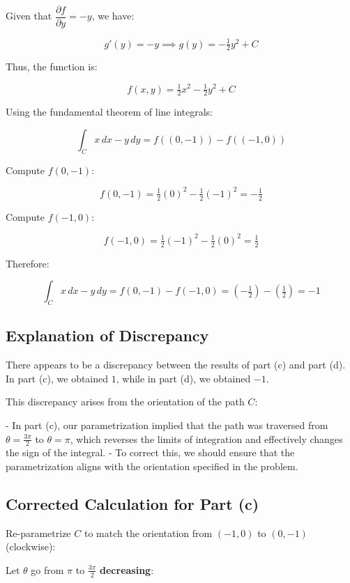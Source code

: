 \documentclass[11pt]{article}
\begin{document}
Given that $\dfrac{\partial f}{\partial y} = -y$, we have:

\[
g'(y) = -y \implies g(y) = -\tfrac{1}{2} y^2 + C
\]

Thus, the function is:

\[
f(x, y) = \tfrac{1}{2} x^2 - \tfrac{1}{2} y^2 + C
\]

Using the fundamental theorem of line integrals:

\[
\int_C x \, dx - y \, dy = f\left( (0, -1) \right) - f\left( (-1, 0) \right)
\]

Compute $f(0, -1)$:

\[
f(0, -1) = \tfrac{1}{2} (0)^2 - \tfrac{1}{2} (-1)^2 = -\tfrac{1}{2}
\]

Compute $f(-1, 0)$:

\[
f(-1, 0) = \tfrac{1}{2} (-1)^2 - \tfrac{1}{2} (0)^2 = \tfrac{1}{2}
\]

Therefore:

\[
\int_C x \, dx - y \, dy = f(0, -1) - f(-1, 0) = \left( -\tfrac{1}{2} \right) - \left( \tfrac{1}{2} \right) = -1
\]

\newpage

\subsection{Explanation of Discrepancy}

There appears to be a discrepancy between the results of part (c) and part (d). In part (c), we obtained $1$, while in part (d), we obtained $-1$.

This discrepancy arises from the orientation of the path $C$:

- In part (c), our parametrization implied that the path was traversed from $\theta = \tfrac{3\pi}{2}$ to $\theta = \pi$, which reverses the limits of integration and effectively changes the sign of the integral.
- To correct this, we should ensure that the parametrization aligns with the orientation specified in the problem.

\newpage

\subsection{Corrected Calculation for Part (c)}

Re-parametrize $C$ to match the orientation from $(-1, 0)$ to $(0, -1)$ (clockwise):

Let $\theta$ go from $\pi$ to $\tfrac{3\pi}{2}$ \textbf{decreasing}:
\end{document}

